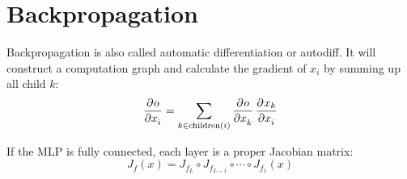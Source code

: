 \section{Backpropagation}

Backpropagation is also called automatic differentiation or autodiff. It will construct a computation graph and calculate the gradient of $x_i$ by summing up all child $k$:
\begin{equation}
    \dpd{o}{x_i} = \sum_{k \in \text{children}(i)} \dpd{o}{x_k} \dpd{x_k}{x_i}
\end{equation}

If the MLP is fully connected, each layer is a proper Jacobian matrix:
\begin{equation}
    J_f(x) = J_{f_L} \circ J_{f_{L-1}} \circ \cdots \circ J_{f_1}(x)
\end{equation}

